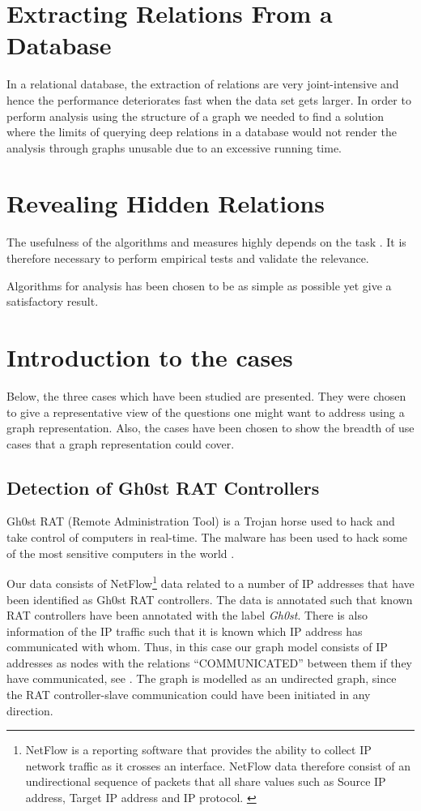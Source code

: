 \section{Extracting Relations From a Database}
In a relational database, the extraction of relations are very joint-intensive and hence the performance deteriorates fast when the data set gets larger\cite{robinson2013}. In order to perform analysis using the structure of a graph we needed to find a solution where the limits of querying deep relations in a database would not render the analysis through graphs unusable due to an excessive running time.


\section{Revealing Hidden Relations}

The usefulness of the algorithms and measures highly depends on the task \cite{fouss2016algorithms}. It is therefore necessary to perform empirical tests and validate the relevance. 

Algorithms for analysis has been chosen to be as simple as possible yet give a satisfactory result. 


\section{Introduction to the cases}
Below, the three cases which have been studied are presented. They were chosen to give a representative view of the questions one might want to address using a graph representation. Also, the cases have been chosen to show the breadth of use cases that a graph representation could cover.

\subsection{Detection of Gh0st RAT Controllers}
Gh0st RAT (Remote Administration Tool) is a Trojan horse used to hack and take control of computers in real-time. The malware has been used to hack some of the most sensitive computers in the world \citep{cyberspies}.

Our data consists of NetFlow\footnote{NetFlow is a reporting software that provides the ability to collect IP network traffic as it crosses an interface. NetFlow data therefore consist of an undirectional sequence of packets that all share values such as Source IP address, Target IP address and IP protocol. \citep{netflow}} data related to a number of IP addresses that have been identified as Gh0st RAT controllers. The data is annotated such that known RAT controllers have been annotated with the label \textit{Gh0st}. There is also information of the IP traffic such that it is known which IP address has communicated with whom. Thus, in this case our graph model consists of IP addresses as nodes with the relations ``COMMUNICATED'' between them if they have communicated, see . The graph is modelled as an undirected graph, since the RAT controller-slave communication could have been initiated in any direction.

